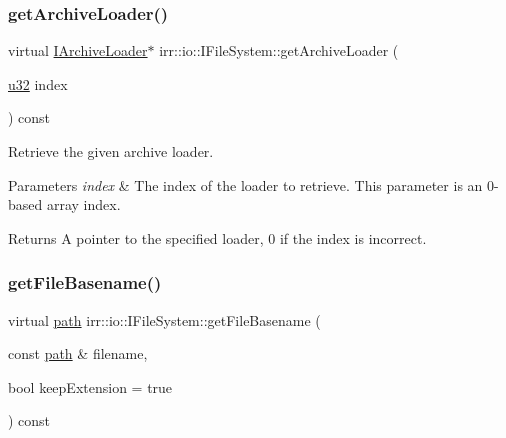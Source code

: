 \subsubsection{\texorpdfstring{get\+Archive\+Loader()}{getArchiveLoader()}}
{\footnotesize\ttfamily virtual \hyperlink{classirr_1_1io_1_1IArchiveLoader}{I\+Archive\+Loader}$\ast$ irr\+::io\+::\+I\+File\+System\+::get\+Archive\+Loader (\begin{DoxyParamCaption}\item[{\hyperlink{namespaceirr_a0416a53257075833e7002efd0a18e804}{u32}}]{index }\end{DoxyParamCaption}) const\hspace{0.3cm}{\ttfamily [pure virtual]}}



Retrieve the given archive loader. 


\begin{DoxyParams}{Parameters}
{\em index} & The index of the loader to retrieve. This parameter is an 0-\/based array index. \\
\hline
\end{DoxyParams}
\begin{DoxyReturn}{Returns}
A pointer to the specified loader, 0 if the index is incorrect. 
\end{DoxyReturn}
\mbox{\label{classirr_1_1io_1_1IFileSystem_a4235989e4ec21c78f1fd1ca861980c6c}} 
\subsubsection{\texorpdfstring{get\+File\+Basename()}{getFileBasename()}}
{\footnotesize\ttfamily virtual \hyperlink{namespaceirr_1_1io_ab1bdc45edb3f94d8319c02bc0f840ee1}{path} irr\+::io\+::\+I\+File\+System\+::get\+File\+Basename (\begin{DoxyParamCaption}\item[{const \hyperlink{namespaceirr_1_1io_ab1bdc45edb3f94d8319c02bc0f840ee1}{path} \&}]{filename,  }\item[{bool}]{keep\+Extension = {\ttfamily true} }\end{DoxyParamCaption}) const\hspace{0.3cm}{\ttfamily [pure virtual]}}




